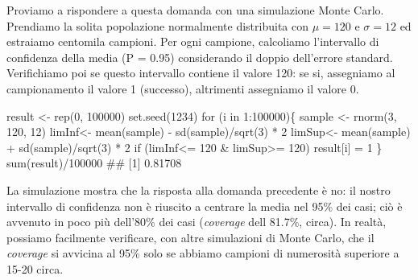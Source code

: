\documentclass[a4paper,12pt,oneside]{book}
\newenvironment{Shaded}{}{}
\newcommand{\KeywordTok}[1]{#1}
\newcommand{\DecValTok}[1]{#1}
\newcommand{\StringTok}[1]{#1}
\newcommand{\CommentTok}[1]{#1}
\newcommand{\ControlFlowTok}[1]{#1}
\newcommand{\OperatorTok}[1]{#1}
\newcommand{\NormalTok}[1]{#1}
\begin{document}
Proviamo a rispondere a questa domanda con una simulazione Monte Carlo. Prendiamo la solita popolazione normalmente distribuita con \(\mu = 120\) e \(\sigma = 12\) ed estraiamo centomila campioni. Per ogni campione, calcoliamo l'intervallo di confidenza della media (P = 0.95) considerando il doppio dell'errore standard. Verifichiamo poi se questo intervallo contiene il valore 120: se si, assegniamo al campionamento il valore 1 (successo), altrimenti assegniamo il valore 0.

\begin{Shaded}
\begin{Highlighting}[]
\NormalTok{result <-}\StringTok{ }\KeywordTok{rep}\NormalTok{(}\DecValTok{0}\NormalTok{, }\DecValTok{100000}\NormalTok{)}
\KeywordTok{set.seed}\NormalTok{(}\DecValTok{1234}\NormalTok{)}
\ControlFlowTok{for}\NormalTok{ (i }\ControlFlowTok{in} \DecValTok{1}\OperatorTok{:}\DecValTok{100000}\NormalTok{)\{}
\NormalTok{  sample <-}\StringTok{ }\KeywordTok{rnorm}\NormalTok{(}\DecValTok{3}\NormalTok{, }\DecValTok{120}\NormalTok{, }\DecValTok{12}\NormalTok{)}
\NormalTok{  limInf<-}\StringTok{ }\KeywordTok{mean}\NormalTok{(sample) }\OperatorTok{-}\StringTok{ }\KeywordTok{sd}\NormalTok{(sample)}\OperatorTok{/}\KeywordTok{sqrt}\NormalTok{(}\DecValTok{3}\NormalTok{) }\OperatorTok{*}\StringTok{ }\DecValTok{2} 
\NormalTok{  limSup<-}\StringTok{ }\KeywordTok{mean}\NormalTok{(sample) }\OperatorTok{+}\StringTok{ }\KeywordTok{sd}\NormalTok{(sample)}\OperatorTok{/}\KeywordTok{sqrt}\NormalTok{(}\DecValTok{3}\NormalTok{) }\OperatorTok{*}\StringTok{ }\DecValTok{2}
  \ControlFlowTok{if}\NormalTok{ (limInf}\OperatorTok{<=}\StringTok{ }\DecValTok{120} \OperatorTok{&}\StringTok{ }\NormalTok{limSup}\OperatorTok{>=}\StringTok{ }\DecValTok{120}\NormalTok{) result[i] =}\StringTok{ }\DecValTok{1}
\NormalTok{\}}
\KeywordTok{sum}\NormalTok{(result)}\OperatorTok{/}\DecValTok{100000}
\CommentTok{## [1] 0.81708}
\end{Highlighting}
\end{Shaded}

La simulazione mostra che la risposta alla domanda precedente è no: il nostro intervallo di confidenza non è riuscito a centrare la media nel 95\% dei casi; ciò è avvenuto in poco più dell'80\% dei casi (\emph{coverage} dell 81.7\%, circa). In realtà, possiamo facilmente verificare, con altre simulazioni di Monte Carlo, che il \emph{coverage} si avvicina al 95\% solo se abbiamo campioni di numerosità superiore a 15-20 circa.
\end{document}
